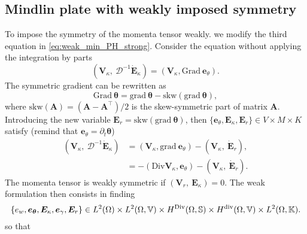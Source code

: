\subsection{Mindlin plate with weakly imposed symmetry}\label{sec:min_weak}
To impose the symmetry of the momenta tensor weakly. we modify the third equation in \eqref{eq:weak_min_PH_strong}. Consider the equation without applying the integration by parts
\[
(\bm{V}_\kappa, \ \mathcal{D}^{-1} \dot{\bm{E}}_\kappa) = (\bm{V}_\kappa, \mathrm{Grad}\ \bm{e}_\theta ). 
\]
The symmetric gradient can be rewritten as 
\[
\mathrm{Grad}\ \bm{\theta} = \mathrm{grad}\ \bm{\theta} - \mathrm{skw}(\mathrm{grad} \ \bm{\theta}),
\]
where $\mathrm{skw}(\bm{A})=(\bm{A} - \bm{A}^\top)/2$ is the skew-symmetric part of matrix $\bm{A}$. Introducing the new variable $\bm{E}_r = \mathrm{skw}(\mathrm{grad}\ \bm{\theta})$, then $\{\bm{e}_\theta, \bm{E}_\kappa, \bm{E}_r\} \in V\times M\times K$ satisfy (remind that $\bm{e}_\theta = \partial_t {\bm{\theta}}$)
\begin{equation*}
\begin{aligned}
(\bm{V}_\kappa, \ \mathcal{D}^{-1} \dot{\bm{E}}_\kappa) &= (\bm{V}_\kappa, \mathrm{grad}\ \bm{e}_\theta) - (\bm{V}_\kappa, \ \dot{\bm{E}}_r), \\
&= -(\mathrm{Div}\bm{V}_\kappa, \bm{e}_\theta) - (\bm{V}_\kappa, \ \dot{\bm{E}}_r).
\end{aligned}
\end{equation*}
The momenta tensor is weakly symmetric if $(\bm{V}_r, \ \bm{E}_{\kappa}) = 0$. The weak formulation then consists in finding 
$$
\{e_w, \bm{e}_{\bm{\theta}}, \bm{E}_{\kappa}, \bm{e}_{\gamma}, \bm{E}_{r}\} \in L^2(\Omega) \times L^2(\Omega, \mathbb{V}) \times H^{\operatorname*{Div}}(\Omega, \mathbb{S}) \times H^{\operatorname{div}}(\Omega, \mathbb{V}) \times L^2(\Omega, \mathbb{K}).
$$
so that 
